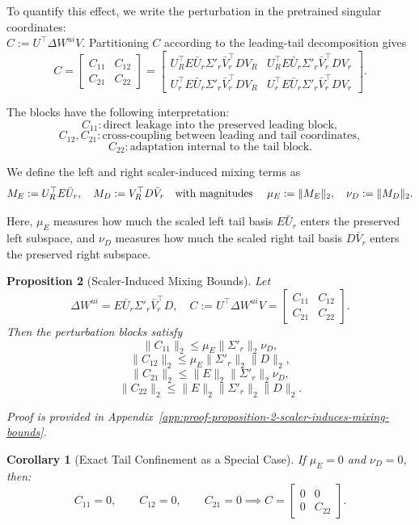 \documentclass{article}
\begin{document}
To quantify this effect, we write the perturbation in the pretrained singular coordinates: \\ $C := U^\top \Delta W^{ui} V$.
Partitioning $C$ according to the leading-tail decomposition gives
\[
C
=
\begin{bmatrix}
C_{11} & C_{12} \\
C_{21} & C_{22}
\end{bmatrix}
=
\begin{bmatrix}
U_R^\top E \bar{U}_r \Sigma'_r \bar{V}_r^\top D V_R
&
U_R^\top E \bar{U}_r \Sigma'_r \bar{V}_r^\top D V_r
\\[0.5em]
U_r^\top E \bar{U}_r \Sigma'_r \bar{V}_r^\top D V_R
&
U_r^\top E \bar{U}_r \Sigma'_r \bar{V}_r^\top D V_r
\end{bmatrix}.
\]

The blocks have the following interpretation:
\[
C_{11}: \text{direct leakage into the preserved leading block},
\]
\[
C_{12}, C_{21}: \text{cross-coupling between leading and tail coordinates},
\]
\[
C_{22}: \text{adaptation internal to the tail block}.
\]

We define the left and right scaler-induced mixing terms as
\[
M_E := U_R^\top E \bar{U}_r,
\quad
M_D := V_R^\top D \bar{V}_r
\text{\quad with magnitudes \quad}
\mu_E := \|M_E\|_2,
\quad
\nu_D := \|M_D\|_2 .
\]

Here, $\mu_E$ measures how much the scaled left tail basis $E\bar{U}_r$ enters
the preserved left subspace, and $\nu_D$ measures how much the scaled right tail
basis $D\bar{V}_r$ enters the preserved right subspace.

\noindent \textbf{Proposition 2} (Scaler-Induced Mixing Bounds).
\textit{
Let
\[
\Delta W^{ui}
=
E \bar{U}_r \Sigma'_r \bar{V}_r^\top D, \quad
C := U^\top \Delta W^{ui} V
=
\begin{bmatrix}
C_{11} & C_{12} \\
C_{21} & C_{22}
\end{bmatrix}.
\]
Then the perturbation blocks satisfy
}
\[
\|C_{11}\|_2
\leq
\mu_E \|\Sigma'_r\|_2 \nu_D,
\]
\[
\|C_{12}\|_2
\leq
\mu_E \|\Sigma'_r\|_2 \|D\|_2,
\]
\[
\|C_{21}\|_2
\leq
\|E\|_2 \|\Sigma'_r\|_2 \nu_D,
\]
\[
\|C_{22}\|_2
\leq
\|E\|_2 \|\Sigma'_r\|_2 \|D\|_2.
\]


\textit{Proof is provided in Appendix~\ref{app:proof-proposition-2-scaler-induces-mixing-bounds}.}

\noindent \textbf{Corollary 1} (Exact Tail Confinement as a Special Case).
\textit{
If $\mu_E = 0$ and $\nu_D = 0$, then:
\[
C_{11}=0,\qquad C_{12}=0,\qquad C_{21}=0 
\implies
C
=
\begin{bmatrix}
0 & 0 \\
0 & C_{22}
\end{bmatrix}.
\]
}
\end{document}
